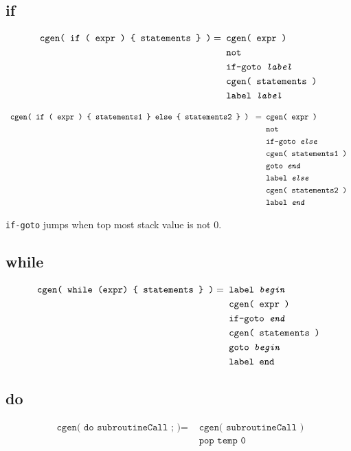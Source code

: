 \documentclass[a4paper]{book}
\begin{document}
\subsection*{if}
\begin{align*}
    \texttt{ cgen( if ( expr ) \{ statements \} )} = & \texttt{ cgen( expr )} \\
    & \texttt{ not } \\
    & \texttt{ if-goto \textit{label} } \\
    & \texttt{ cgen( statements ) } \\
    & \texttt{ label \textit{label} }
\end{align*}

\begin{align*}
    \texttt{ cgen( if ( expr ) \{ statements1 \} else \{ statements2 \} ) } = & \texttt{ cgen( expr ) } \\
    & \texttt{ not } \\
    & \texttt{ if-goto \textit{else}} \\
    & \texttt{ cgen( statements1 )} \\
    & \texttt{ goto \textit{end} } \\
    & \texttt{ label \textit{else} } \\
    & \texttt{ cgen( statements2 ) } \\
    & \texttt{ label \textit{end} }
\end{align*}

\texttt{if-goto} jumps when top most stack value is not 0.

\subsection*{while}
\begin{align*}
    \texttt{ cgen( while (expr) \{ statements \} )} = & \texttt{ label \textit{begin} } \\
    & \texttt{ cgen( expr )} \\
    & \texttt{ if-goto \textit{end} } \\
    & \texttt{ cgen( statements ) } \\
    & \texttt{ goto \textit{begin} } \\
    & \texttt{ label \texttt{end} }
\end{align*}


\subsection*{do}
\begin{align*}
    \texttt{ cgen( do subroutineCall ; )} = & \texttt{ cgen( subroutineCall )} \\
    & \texttt{ pop temp 0 }
\end{align*}
\end{document}
